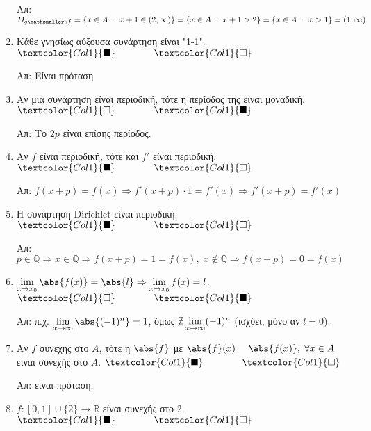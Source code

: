 \begin{enumerate}[itemsep=.5\baselineskip]
    Απ: $ D_{g \mathsmaller\circ f} = \{ x \in A \; : \; x+1 \in (2, \infty) \} = 
    \{ x \in A \; : \; x + 1 > 2 \} = \{ x \in A \; : \; x > 1 \} = (1, \infty) $

  \item \textcolor{Col1}{Κάθε γνησίως αύξουσα συνάρτηση είναι "1-1"}.
    \hfill $\textcolor{Col1}{\blacksquare} \qquad \qquad \textcolor{Col1}{\square}$

    Απ: Είναι πρόταση

  \item \textcolor{Col1}{Αν μιά συνάρτηση είναι περιοδική, τότε η περίοδος της είναι
    μοναδική}.
    \hfill $\textcolor{Col1}{\square} \qquad \qquad \textcolor{Col1}{\blacksquare}$

    Απ: Το $ 2p $ είναι επίσης περίοδος.

  \item \textcolor{Col1}{Αν $f$ είναι περιοδική, τότε και $ f' $ είναι περιοδική}.
    \hfill $\textcolor{Col1}{\blacksquare} \qquad \qquad \textcolor{Col1}{\square}$

    Απ: $ f(x+p)=f(x) \Rightarrow f'(x+p)\cdot 1 = f'(x) \Rightarrow f'(x+p)=f'(x) $

  \item \textcolor{Col1}{Η συνάρτηση Dirichlet είναι περιοδική}.
    \hfill $\textcolor{Col1}{\blacksquare} \qquad \qquad \textcolor{Col1}{\square}$

    Απ: $ p \in \mathbb{Q} \Rightarrow x \in \mathbb{Q} \Rightarrow f(x+p) = 1 = f(x), 
    \; x \not \in \mathbb{Q} \Rightarrow f(x+p)=0=f(x) $

  \item \textcolor{Col1}{$ \lim\limits_{x \to x_{0}} \abs{f(x)} = \abs{l} \Rightarrow
    \lim\limits_{x \to x_{0}} f(x) = l $}.
    \hfill $\textcolor{Col1}{\square} \qquad \qquad \textcolor{Col1}{\blacksquare}$

    Απ: π.χ. $ \lim\limits_{x \to \infty} \abs{(-1)^{n}} = 1 $, όμως 
    $  \cancel{\exists} \lim\limits_{x \to \infty} (-1)^{n} $ \; 
    (ισχύει, μόνο αν $ l=0 $).

  \item \textcolor{Col1}{Αν $f$ συνεχής στο $A$, τότε η $ \abs{f} $ με $ \abs{f}(x) 
    = \abs{f(x)}, \; \forall x \in A $ είναι συνεχής στο $A$}.
    \hfill $\textcolor{Col1}{\blacksquare} \qquad \qquad \textcolor{Col1}{\square}$

    Απ: είναι πρόταση. 

  \item \textcolor{Col1}{$ f \colon [0,1] \cup \{ 2 \} \to \mathbb{R} $ είναι 
    συνεχής στο 2}.
    \hfill $\textcolor{Col1}{\blacksquare} \qquad \qquad \textcolor{Col1}{\square}$


\end{enumerate}
